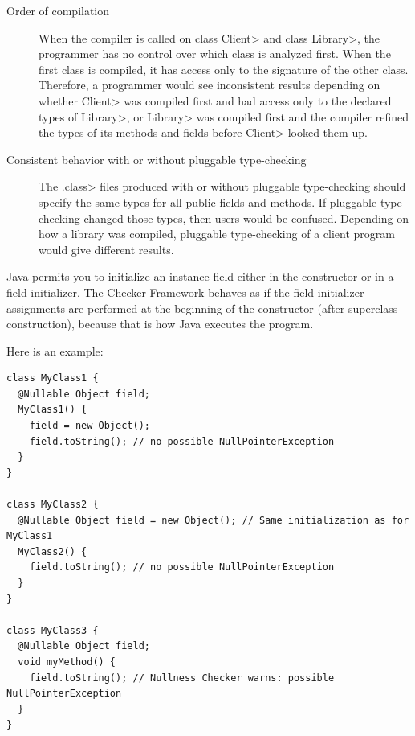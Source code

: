 \begin{description}
\item[Order of compilation]
  When the compiler is called on class \<Client> and class \<Library>, the
  programmer has no control over which class is analyzed first.  When the
  first class is compiled, it has access only to the signature of the other
  class.  Therefore, a programmer would see inconsistent results depending
  on whether \<Client> was compiled first and had access only to the
  declared types of \<Library>, or \<Library> was compiled first and
  the compiler refined the types of its methods and fields before \<Client>
  looked them up.

\item[Consistent behavior with or without pluggable type-checking]
  The \<.class> files produced with or without pluggable type-checking
  should specify the same types for all public fields and methods.  If
  pluggable type-checking changed those types, then users would be
  confused.  Depending on how a library was compiled, pluggable
  type-checking of a client program would give different results.

\end{description}




Java permits you to initialize an instance field either in the constructor
or in a field initializer.  The Checker Framework behaves as if the field
initializer assignments are performed at the beginning of the constructor
(after superclass construction), because that is how Java executes the
program.

Here is an example:

\begin{Verbatim}
class MyClass1 {
  @Nullable Object field;
  MyClass1() {
    field = new Object();
    field.toString(); // no possible NullPointerException
  }
}

class MyClass2 {
  @Nullable Object field = new Object(); // Same initialization as for MyClass1
  MyClass2() {
    field.toString(); // no possible NullPointerException
  }
}

class MyClass3 {
  @Nullable Object field;
  void myMethod() {
    field.toString(); // Nullness Checker warns: possible NullPointerException
  }
}
\end{Verbatim}

